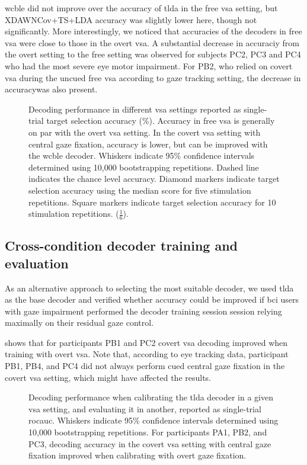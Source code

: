 \documentclass[twocolumn]{article}
\begin{document}
\Ac{wcble} did not improve over the accuracy of \ac{tlda} in the free \ac{vsa} setting, but
XDAWNCov+TS+LDA accuracy was slightly lower here, though not
significantly.
More interestingly, we noticed that accuracies of the decoders in free
\ac{vsa} were close to those in the overt \ac{vsa}.
A substantial decrease in accuraciy from the overt setting to the free
setting was observed for subjects PC2, PC3 and PC4 who had the most severe eye
motor impairment.
For PB2, who relied on covert \ac{vsa} during the uncued free \ac{vsa}
according to gaze tracking setting, the decrease in accuracywas also
present.
\begin{figure}
	
	\caption{%
		Decoding performance in different \ac{vsa} settings reported as
		single-trial target selection accuracy (\%).
		Accuracy in free \ac{vsa} is generally on par with the overt \ac{vsa}
		setting.
		In the covert \ac{vsa} setting with central gaze fixation, accuracy is lower, but can
		be improved with the \ac{wcble} decoder.
		Whiskers indicate 95\% confidence intervals determined using 10,000 bootstrapping
		repetitions. Dashed line indicates the chance level accuracy. Diamond
		markers indicate target selection accuracy using the median score for five stimulation
		repetitions. Square markers indicate target selection accuracy for 10
		stimulation repetitions.
		($\frac{1}{6}$).
	}
	\label{fig:patients/decode}
\end{figure}

\subsection{Cross-condition decoder training and evaluation}
\label{sec:patients/outcomes/cross}

As an alternative approach to selecting the most suitable decoder, we used
\ac{tlda} as the base decoder and verified whether accuracy could be improved
if \ac{bci} users with gaze impairment performed the decoder training session
session relying maximally on their residual gaze control.

 shows that for participants PB1 and PC2 covert \ac{vsa} decoding
improved when training with overt \ac{vsa}.
Note that, according to eye tracking data, participant PB1, PB4, and PC4 did not
always perform cued central gaze fixation in the covert \ac{vsa} setting,
which might have affected the results.
\begin{figure}
	
	\caption{
		Decoding performance when calibrating the \ac{tlda} decoder in a given \ac{vsa}
		setting, and evaluating it in another, reported as
		single-trial \ac{rocauc}.
		Whiskers indicate 95\% confidence intervals determined using 10,000 bootstrapping
		repetitions.
		For participants PA1, PB2, and PC3, decoding accuracy in the covert \ac{vsa} setting with central gaze fixation
		improved when calibrating with overt gaze fixation.
	}
	\label{fig:patients/cross}
\end{figure}
\end{document}
